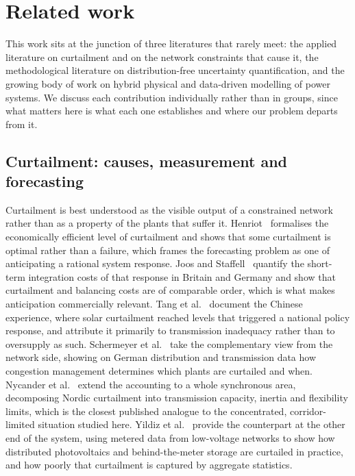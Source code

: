 \documentclass[preprint,3p,times]{elsarticle}
\begin{document}
\section{Related work}
\label{sec:related}

This work sits at the junction of three literatures that rarely meet: the applied literature on curtailment and on the network constraints that cause it, the methodological literature on distribution-free uncertainty quantification, and the growing body of work on hybrid physical and data-driven modelling of power systems. We discuss each contribution individually rather than in groups, since what matters here is what each one establishes and where our problem departs from it.

\subsection{Curtailment: causes, measurement and forecasting}

Curtailment is best understood as the visible output of a constrained network rather than as a property of the plants that suffer it. Henriot~\cite{henriot2015} formalises the economically efficient level of curtailment and shows that some curtailment is optimal rather than a failure, which frames the forecasting problem as one of anticipating a rational system response. Joos and Staffell~\cite{joos2018} quantify the short-term integration costs of that response in Britain and Germany and show that curtailment and balancing costs are of comparable order, which is what makes anticipation commercially relevant. Tang et al.~\cite{tang2018} document the Chinese experience, where solar curtailment reached levels that triggered a national policy response, and attribute it primarily to transmission inadequacy rather than to oversupply as such. Schermeyer et al.~\cite{schermeyer2018} take the complementary view from the network side, showing on German distribution and transmission data how congestion management determines which plants are curtailed and when. Nycander et al.~\cite{nycander2020} extend the accounting to a whole synchronous area, decomposing Nordic curtailment into transmission capacity, inertia and flexibility limits, which is the closest published analogue to the concentrated, corridor-limited situation studied here. Yildiz et al.~\cite{yildiz2023} provide the counterpart at the other end of the system, using metered data from low-voltage networks to show how distributed photovoltaics and behind-the-meter storage are curtailed in practice, and how poorly that curtailment is captured by aggregate statistics.
\end{document}
